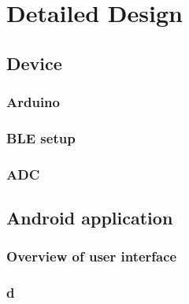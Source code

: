 \chapter{Detailed Design}
\label{chap:systemdesign}

\section{Device}
\subsection{Arduino}
\subsection{BLE setup}
\subsection{ADC} 

\section{Android application}

\subsection{Overview of user interface}

\subsection{d}

